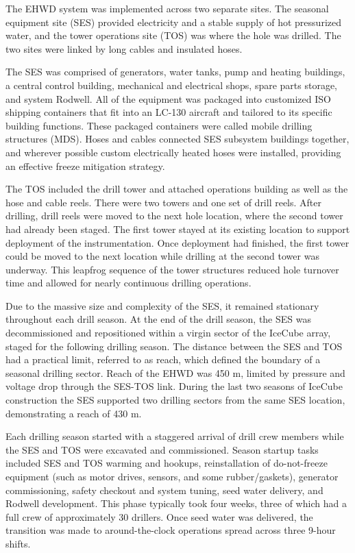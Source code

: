 The EHWD system was implemented across two separate sites.  The seasonal equipment site (SES) provided electricity and a stable supply of hot pressurized water, and the tower operations site (TOS) was where the hole was drilled.  The two sites were linked by long cables and insulated hoses.

The SES was comprised of generators, water tanks, pump and heating buildings, a central control building, mechanical and electrical shops, spare parts storage, and system Rodwell.  All of the equipment was packaged into customized ISO shipping containers that fit into an LC-130 aircraft and tailored to its specific building functions.  These packaged containers were called mobile drilling structures (MDS).  Hoses and cables connected SES subsystem buildings together, and wherever possible custom electrically heated hoses were installed, providing an effective freeze mitigation strategy.

The TOS included the drill tower and attached operations building as well as the hose and cable reels.  There were two towers and one set of drill reels.  After drilling, drill reels were moved to the next hole location, where the second tower had already been staged.  The first tower stayed at its existing location to support deployment of the instrumentation.  Once deployment had finished, the first tower could be moved to the next location while drilling at the second tower was underway.  This leapfrog sequence of the tower structures reduced hole turnover time and allowed for nearly continuous drilling operations.

Due to the massive size and complexity of the SES, it remained stationary throughout each drill season.  At the end of the drill season, the SES was decommissioned and repositioned within a virgin sector of the IceCube array, staged for the following drilling season.  The distance between the SES and TOS had a practical limit, referred to as reach, which defined the boundary of a seasonal drilling sector.  Reach of the EHWD was 450 m, limited by pressure and voltage drop through the SES-TOS link.  During the last two seasons of IceCube construction the SES supported two drilling sectors from the same SES location, demonstrating a reach of 430 m.

Each drilling season started with a staggered arrival of drill crew members while the SES and TOS were excavated and commissioned.  Season startup tasks included SES and TOS warming and hookups, reinstallation of do-not-freeze equipment (such as motor drives, sensors, and some rubber/gaskets), generator commissioning, safety checkout and system tuning, seed water delivery, and Rodwell development.  This phase typically took four weeks, three of which had a full crew of approximately 30 drillers.  Once seed water was delivered, the transition was made to around-the-clock operations spread across three 9-hour shifts.

